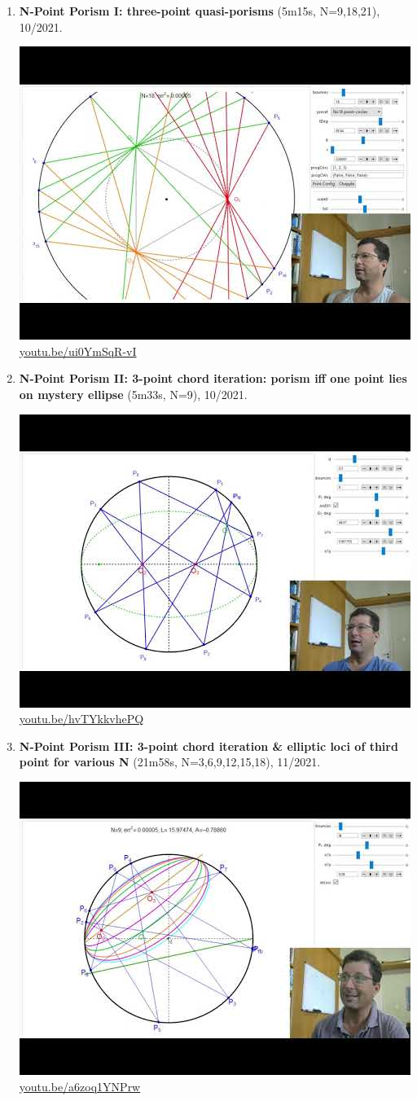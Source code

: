 \documentclass[12pt]{amsart}
\begin{document}
\begin{enumerate}[resume]
\item \textbf{N-Point Porism I: three-point quasi-porisms} (5m15s, N=9,18,21), 10/2021. 
\begin{center}\includegraphics[width=.5\textwidth]{pics/ui0YmSqR-vI.jpg} \\ 
\href{https://youtu.be/ui0YmSqR-vI}{\url{youtu.be/ui0YmSqR-vI}}\end{center}
% 
\item \textbf{N-Point Porism II: 3-point chord iteration: porism iff one point lies on mystery ellipse} (5m33s, N=9), 10/2021. 
\begin{center}\includegraphics[width=.5\textwidth]{pics/hvTYkkvhePQ.jpg} \\ 
\href{https://youtu.be/hvTYkkvhePQ}{\url{youtu.be/hvTYkkvhePQ}}\end{center}
% 
\item \textbf{N-Point Porism III: 3-point chord iteration \& elliptic loci of third point for various N} (21m58s, N=3,6,9,12,15,18), 11/2021. 
\begin{center}\includegraphics[width=.5\textwidth]{pics/a6zoq1YNPrw.jpg} \\ 
\href{https://youtu.be/a6zoq1YNPrw}{\url{youtu.be/a6zoq1YNPrw}}\end{center}
% 
\end{enumerate}
\end{document}
